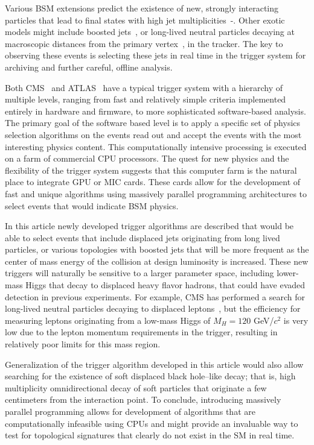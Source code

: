 \documentclass{JINST}
\begin{document}
Various BSM extensions predict the existence of new, strongly interacting particles that lead to final states
with high jet multiplicities~\cite{bib:sixjets}-\cite{bib:altchiral}. Other exotic models might include boosted 
jets~\cite{Thaler:2008ju},\cite{Altheimer:2012mn} or long-lived neutral particles decaying at macroscopic distances 
from the primary vertex~\cite{bib:hiddenvalley},\cite{Halyo:2013yfa} 
in the tracker. The key to observing these events is selecting these jets in real time in the trigger system for archiving
 and further careful, offline analysis.

Both CMS~\cite{Chatrchyan:2008aa} and ATLAS~\cite{Aad:2008zzm} have a typical trigger system with a hierarchy of multiple levels, 
ranging from fast and relatively simple criteria implemented entirely in hardware and firmware, to more sophisticated software-based analysis. 
The primary goal of the software based level is to apply a specific set of 
physics selection algorithms on the events read out and accept the events with the most interesting physics 
content. This computationally intensive processing is executed on a farm of commercial CPU processors.
The quest for new physics and the flexibility of the trigger system suggests that this computer farm is the natural
place to integrate GPU or MIC cards. These cards allow for the development of fast and unique algorithms using massively
 parallel programming architectures to select events that would indicate BSM physics. 

In this article newly developed trigger algorithms are described that would be able to select events
that include displaced jets originating from long lived particles, or various topologies with boosted jets that will
be more frequent as the center of mass energy of the collision at design luminosity is increased. These new
triggers will naturally be sensitive to a larger parameter space, including lower-mass Higgs that decay to
displaced heavy flavor hadrons, that could have evaded detection in previous experiments. For example, CMS has 
performed a search for long-lived neutral particles decaying to displaced leptons~\cite{Chatrchyan:2012jna}, 
but the efficiency for measuring leptons originating from a low-mass Higgs of $M_H = 120$ GeV/$c^2$ is very low 
due to the lepton momentum requirements in the trigger, resulting in relatively poor limits for this mass region.

Generalization of the trigger algorithm developed in this article would also allow searching for 
the existence of soft displaced black hole--like decay; that is, high multiplicity omnidirectional decay of soft particles  
that originate a few centimeters from the interaction point. To conclude, introducing massively parallel programming
allows for development of algorithms that are computationally infeasible using CPUs and
might provide an invaluable way to test for topological signatures that clearly do not exist in the SM in real time.
\end{document}
